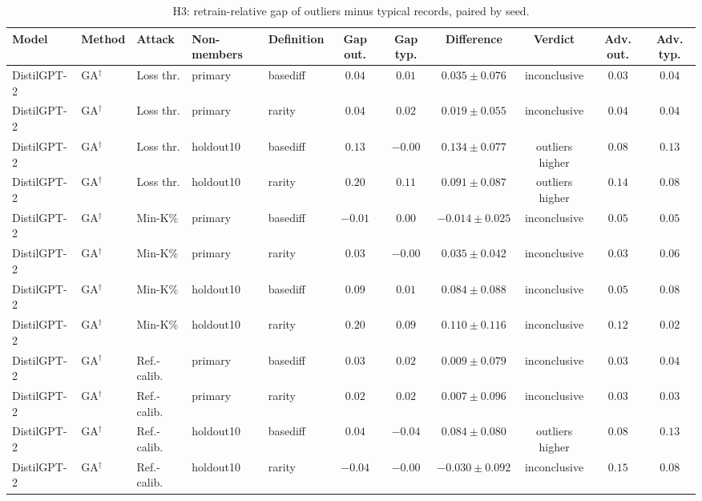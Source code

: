 \begin{table}[t]
\centering
\caption{H3: retrain-relative gap of outliers minus typical records, paired by seed.}
\label{tab:h3}
\footnotesize
\renewcommand{\arraystretch}{1.2}
\setlength{\tabcolsep}{2pt}
\begin{tabular*}{\textwidth}{@{\extracolsep{\fill}}lllllcccccc@{}}
\toprule
\textbf{Model} & \textbf{Method} & \textbf{Attack} & \textbf{Non-members} & \textbf{Definition} & \textbf{Gap out.} & \textbf{Gap typ.} & \textbf{Difference} & \textbf{Verdict} & \textbf{Adv. out.} & \textbf{Adv. typ.} \\
\midrule
DistilGPT-2 & GA$^{\dagger}$ & Loss thr. & primary & basediff & $0.04$ & $0.01$ & $0.035 \pm 0.076$ & inconclusive & $0.03$ & $0.04$ \\
DistilGPT-2 & GA$^{\dagger}$ & Loss thr. & primary & rarity & $0.04$ & $0.02$ & $0.019 \pm 0.055$ & inconclusive & $0.04$ & $0.04$ \\
DistilGPT-2 & GA$^{\dagger}$ & Loss thr. & holdout10 & basediff & $0.13$ & $-0.00$ & $0.134 \pm 0.077$ & outliers higher & $0.08$ & $0.13$ \\
DistilGPT-2 & GA$^{\dagger}$ & Loss thr. & holdout10 & rarity & $0.20$ & $0.11$ & $0.091 \pm 0.087$ & outliers higher & $0.14$ & $0.08$ \\
DistilGPT-2 & GA$^{\dagger}$ & Min-K\% & primary & basediff & $-0.01$ & $0.00$ & $-0.014 \pm 0.025$ & inconclusive & $0.05$ & $0.05$ \\
DistilGPT-2 & GA$^{\dagger}$ & Min-K\% & primary & rarity & $0.03$ & $-0.00$ & $0.035 \pm 0.042$ & inconclusive & $0.03$ & $0.06$ \\
DistilGPT-2 & GA$^{\dagger}$ & Min-K\% & holdout10 & basediff & $0.09$ & $0.01$ & $0.084 \pm 0.088$ & inconclusive & $0.05$ & $0.08$ \\
DistilGPT-2 & GA$^{\dagger}$ & Min-K\% & holdout10 & rarity & $0.20$ & $0.09$ & $0.110 \pm 0.116$ & inconclusive & $0.12$ & $0.02$ \\
DistilGPT-2 & GA$^{\dagger}$ & Ref.-calib. & primary & basediff & $0.03$ & $0.02$ & $0.009 \pm 0.079$ & inconclusive & $0.03$ & $0.04$ \\
DistilGPT-2 & GA$^{\dagger}$ & Ref.-calib. & primary & rarity & $0.02$ & $0.02$ & $0.007 \pm 0.096$ & inconclusive & $0.03$ & $0.03$ \\
DistilGPT-2 & GA$^{\dagger}$ & Ref.-calib. & holdout10 & basediff & $0.04$ & $-0.04$ & $0.084 \pm 0.080$ & outliers higher & $0.08$ & $0.13$ \\
DistilGPT-2 & GA$^{\dagger}$ & Ref.-calib. & holdout10 & rarity & $-0.04$ & $-0.00$ & $-0.030 \pm 0.092$ & inconclusive & $0.15$ & $0.08$ \\

\end{tabular*}
\end{table}
